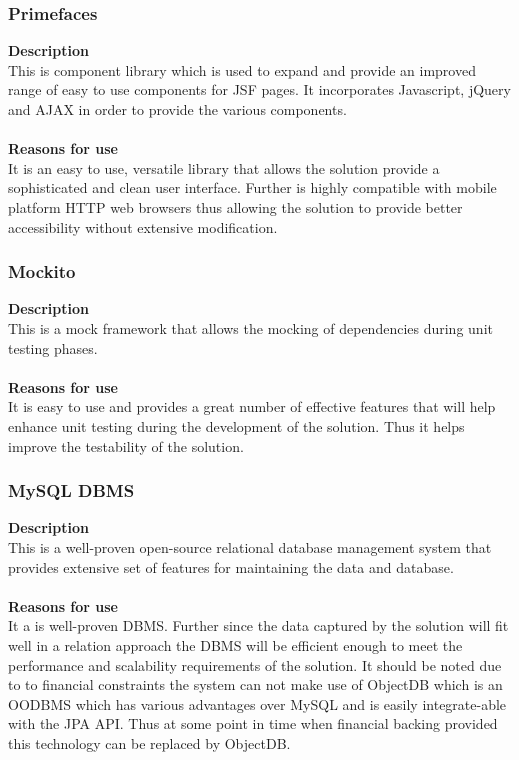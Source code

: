 \documentclass[12pt]{article}
\begin{document}
\subsubsection{Primefaces}
\textbf{Description}\\
This is component library which is used to expand and provide an improved range of easy to use components for JSF pages. It incorporates Javascript, jQuery and AJAX in order to provide the various components.\\\\
\textbf{Reasons for use}\\
It is an easy to use, versatile library that allows the solution provide a sophisticated and clean user interface. Further is highly compatible with mobile platform HTTP web browsers thus allowing the solution to provide better accessibility without extensive modification.    

\subsubsection{Mockito}
\textbf{Description}\\
This is a mock framework that allows the mocking of dependencies during unit testing phases.\\\\
\textbf{Reasons for use}\\
It is easy to use and provides a great number of effective features that will help enhance unit testing during the development of the solution. Thus it helps improve the testability of the solution.

\subsubsection{MySQL DBMS}
\textbf{Description}\\
This is a well-proven open-source relational database management system that provides extensive set of features for maintaining the data and database.\\\\
\textbf{Reasons for use}\\
It a is well-proven DBMS. Further since the data captured by the solution will fit well in a relation approach the DBMS will be efficient enough to meet the performance and scalability requirements of the solution. It should be noted due to to financial constraints the system can not make use of ObjectDB which is an OODBMS which has various advantages over MySQL and is easily integrate-able with the JPA API. Thus at some point in time when financial backing provided this technology can be replaced by ObjectDB. 
\end{document}
